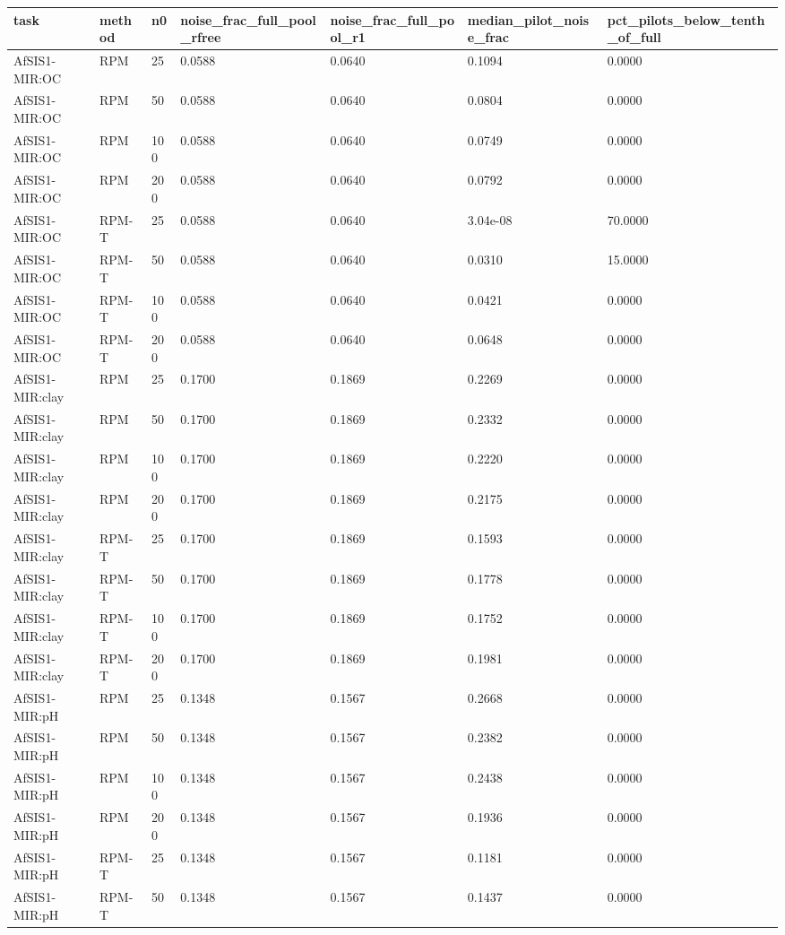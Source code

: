 \begin{tabular}{lllllll}
\hline
task & method & n0 & noise\_frac\_full\_pool\_rfree & noise\_frac\_full\_pool\_r1 & median\_pilot\_noise\_frac & pct\_pilots\_below\_tenth\_of\_full \\
\hline
AfSIS1-MIR:OC & RPM & 25 & 0.0588 & 0.0640 & 0.1094 & 0.0000 \\
AfSIS1-MIR:OC & RPM & 50 & 0.0588 & 0.0640 & 0.0804 & 0.0000 \\
AfSIS1-MIR:OC & RPM & 100 & 0.0588 & 0.0640 & 0.0749 & 0.0000 \\
AfSIS1-MIR:OC & RPM & 200 & 0.0588 & 0.0640 & 0.0792 & 0.0000 \\
AfSIS1-MIR:OC & RPM-T & 25 & 0.0588 & 0.0640 & 3.04e-08 & 70.0000 \\
AfSIS1-MIR:OC & RPM-T & 50 & 0.0588 & 0.0640 & 0.0310 & 15.0000 \\
AfSIS1-MIR:OC & RPM-T & 100 & 0.0588 & 0.0640 & 0.0421 & 0.0000 \\
AfSIS1-MIR:OC & RPM-T & 200 & 0.0588 & 0.0640 & 0.0648 & 0.0000 \\
AfSIS1-MIR:clay & RPM & 25 & 0.1700 & 0.1869 & 0.2269 & 0.0000 \\
AfSIS1-MIR:clay & RPM & 50 & 0.1700 & 0.1869 & 0.2332 & 0.0000 \\
AfSIS1-MIR:clay & RPM & 100 & 0.1700 & 0.1869 & 0.2220 & 0.0000 \\
AfSIS1-MIR:clay & RPM & 200 & 0.1700 & 0.1869 & 0.2175 & 0.0000 \\
AfSIS1-MIR:clay & RPM-T & 25 & 0.1700 & 0.1869 & 0.1593 & 0.0000 \\
AfSIS1-MIR:clay & RPM-T & 50 & 0.1700 & 0.1869 & 0.1778 & 0.0000 \\
AfSIS1-MIR:clay & RPM-T & 100 & 0.1700 & 0.1869 & 0.1752 & 0.0000 \\
AfSIS1-MIR:clay & RPM-T & 200 & 0.1700 & 0.1869 & 0.1981 & 0.0000 \\
AfSIS1-MIR:pH & RPM & 25 & 0.1348 & 0.1567 & 0.2668 & 0.0000 \\
AfSIS1-MIR:pH & RPM & 50 & 0.1348 & 0.1567 & 0.2382 & 0.0000 \\
AfSIS1-MIR:pH & RPM & 100 & 0.1348 & 0.1567 & 0.2438 & 0.0000 \\
AfSIS1-MIR:pH & RPM & 200 & 0.1348 & 0.1567 & 0.1936 & 0.0000 \\
AfSIS1-MIR:pH & RPM-T & 25 & 0.1348 & 0.1567 & 0.1181 & 0.0000 \\
AfSIS1-MIR:pH & RPM-T & 50 & 0.1348 & 0.1567 & 0.1437 & 0.0000 \\

\end{tabular}
